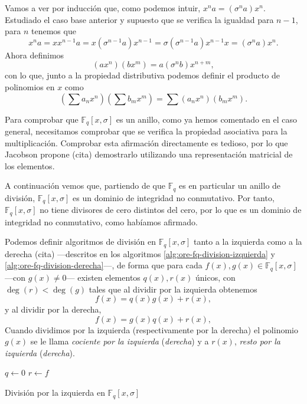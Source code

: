 Vamos a ver por inducción que, como podemos intuir, \(x^n a = (\sigma^n a)x^n\). 
Estudiado el caso base anterior y supuesto que se verifica la igualdad para \(n - 1\), para \(n\) tenemos que
\[
  x^{n}a = xx^{n - 1}a = x(\sigma^{n-1} a)x^{n-1} = \sigma(\sigma^{n-1} a)x^{n-1}x = (\sigma^{n}a)x^{n}.
\]
Ahora definimos
\[
  (ax^n)(bx^m) = a(\sigma^n b)x^{n+m},
\]
con lo que, junto a la propiedad distributiva podemos definir el producto de polinomios en \(x\) como
\[
  \textstyle(\sum a_nx^n)(\sum b_mx^m) = \sum(a_nx^n)(b_mx^m).
\]

Para comprobar que \(\mathbb F_q[x, \sigma]\) es un anillo, como ya hemos comentado en el caso general, necesitamos comprobar que se verifica la propiedad asociativa para la multiplicación.
Comprobar esta afirmación directamente es tedioso, por lo que Jacobson propone (cita) demostrarlo utilizando una representación matricial de los elementos.

A continuación vemos que, partiendo de que \(\mathbb F_q\) es en particular un anillo de división, \(\mathbb F_q[x, \sigma]\) es un dominio de integridad no conmutativo.
Por tanto, \(\mathbb F_q[x, \sigma]\) no tiene divisores de cero distintos del cero, por lo que es un dominio de integridad no conmutativo, como habíamos afirmado.

Podemos definir algoritmos de división en \(\mathbb F_q[x, \sigma]\) tanto a la izquierda como a la derecha (cita)  —descritos en los algoritmos \ref{alg:ore-fq-division-izquierda} y \ref{alg:ore-fq-division-derecha}—, de forma que para cada \(f(x), g(x) \in \mathbb F_q[x, \sigma]\) —con \(g(x) \neq 0\)— existen elementos \(q(x), r(x)\) únicos, con \(\deg(r) < \deg(g)\) tales que al dividir por la izquierda obtenemos
\[
  f(x) = q(x)g(x) + r(x),
\]
y al dividir por la derecha, 
\[
  f(x) = g(x)q(x) + r(x),
\]
Cuando dividimos por la izquierda (respectivamente por la derecha) el polinomio \(g(x)\) se le llama \textit{cociente por la izquierda} (\textit{derecha}) y a \(r(x)\), \textit{resto por la izquierda} (\textit{derecha}).

\begin{Ualgorithm}[h]
  \DontPrintSemicolon
  \(q \longleftarrow 0\)\;
  \(r \longleftarrow f\)\;
  \caption{División por la izquierda en \(\mathbb F_q[x, \sigma]\)}
  \label{alg:ore-fq-division-izquierda}
 \end{Ualgorithm}

